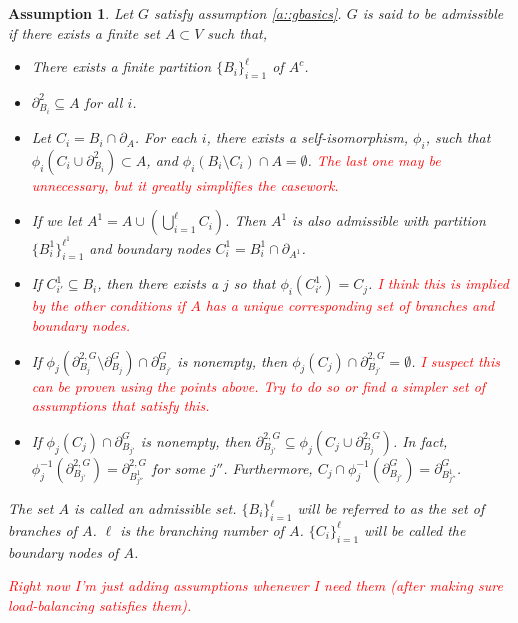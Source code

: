 \documentclass[12pt]{article}
\newcommand{\tr}{\textcolor{red}}
\newcommand{\ind}{\hspace{24pt}}
\newcommand{\neigh}[1]{\partial_{#1}}				%
\newcommand{\dneigh}[1]{\partial^2_{#1}}			%
\newcommand{\gneigh}[2]{\partial^{#1}_{#2}}			%
\newcommand{\dgneigh}[2]{\partial^{2,#1}_{#2}}		%
\newcommand{\indx}[1]{^{#1}}						%
\newcommand{\psize}{\ell}							%
\newtheorem{assu}[thms]{Assumption}
\begin{document}
\begin{assu}
Let \(G\) satisfy assumption \ref{a::gbasics}. \(G\) is said to be admissible if there exists a finite set \(A \subset V\) such that,

\begin{itemize}
\item There exists a finite partition \(\{B_i\}_{i=1}^\psize\) of \(A^c\).

\item \(\dneigh{B_i} \subseteq A\) for all \(i\).

\item Let \(C_i = B_i\cap\neigh{A}\). For each \(i\), there exists a self-isomorphism, \(\phi_i\), such that \(\phi_i(C_i\cup \dneigh{B_i}) \subset A\), and \(\phi_i(B_i\setminus C_i)\cap A = \emptyset\). \tr{The last one may be unnecessary, but it greatly simplifies the casework.}

\item If we let \(A\indx{1} = A\cup \left(\bigcup_{i=1}^\psize C_i\right)\). Then \(A\indx{1}\) is also admissible with partition \(\{B\indx{1}_i\}_{i=1}^{\psize\indx{1}}\) and boundary nodes \(C\indx{1}_i = B\indx{1}_i\cap \neigh{A\indx{1}}\).

\item If \(C\indx{1}_{i'} \subseteq B_i\), then there exists a \(j\) so that \(\phi_i(C\indx{1}_{i'}) = C_j\). \tr{I think this is implied by the other conditions if \(A\) has a unique corresponding set of branches and boundary nodes.}

\item If \(\phi_j(\dgneigh{G}{B_j}\setminus\gneigh{G}{B_j})\cap\gneigh{G}{B_{j'}}\) is nonempty, then \(\phi_j(C_j)\cap\dgneigh{G}{B_{j'}} = \emptyset\). \tr{I suspect this can be proven using the points above. Try to do so or find a simpler set of assumptions that satisfy this.}

\item If \(\phi_j(C_j) \cap \gneigh{G}{B_{j'}}\) is nonempty, then \(\dgneigh{G}{B_{j'}} \subseteq \phi_j(C_j\cup\dgneigh{G}{B_j})\). In fact, \(\phi_j^{-1}(\dgneigh{G}{B_{j'}}) = \dgneigh{G}{B_{j''}\indx{1}}\) for some \(j''\). Furthermore, \(C_j\cap\phi_j^{-1}(\gneigh{G}{B_{j'}}) = \gneigh{G}{B_{j''}\indx{1}}\).
\end{itemize}

The set \(A\) is called an admissible set. \(\{B_i\}_{i=1}^\psize\) will be referred to as the set of branches of \(A\). \(\psize\) is the branching number of \(A\). \(\{C_i\}_{i=1}^\psize\) will be called the boundary nodes of \(A\).

\ind \tr{Right now I'm just adding assumptions whenever I need them (after making sure load-balancing satisfies them).}
\label{a::admissible}
\end{assu}
\end{document}
